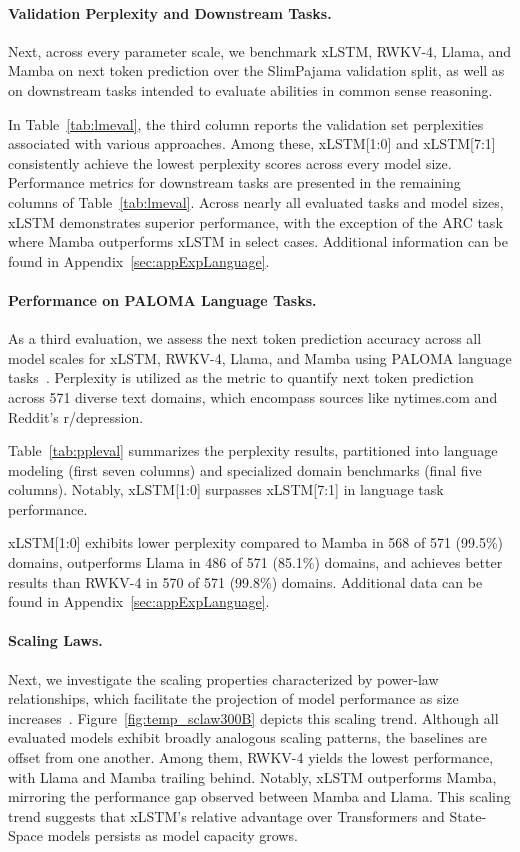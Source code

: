 \paragraph{Validation Perplexity and Downstream Tasks.}
\label{sec:spaj_downstream_eval}
Next, across every parameter scale, we benchmark xLSTM, RWKV-4, Llama, and Mamba on next token prediction over the SlimPajama validation split, as well as on downstream tasks intended to evaluate abilities in common sense reasoning.

In Table~\ref{tab:lmeval}, the third column reports the validation set perplexities associated with various approaches. Among these, xLSTM[1:0] and xLSTM[7:1] consistently achieve the lowest perplexity scores across every model size. Performance metrics for downstream tasks are presented in the remaining columns of Table~\ref{tab:lmeval}. Across nearly all evaluated tasks and model sizes, xLSTM demonstrates superior performance, with the exception of the ARC task where Mamba outperforms xLSTM in select cases. Additional information can be found in Appendix~\ref{sec:appExpLanguage}.

\paragraph{Performance on PALOMA Language Tasks.} As a third evaluation, we assess the next token prediction accuracy across all model scales for xLSTM, RWKV-4, Llama, and Mamba using PALOMA language tasks~\citep{Magnusson:23arxivshort}. Perplexity is utilized as the metric to quantify next token prediction across 571 diverse text domains, which encompass sources like nytimes.com and Reddit's r/depression.

Table~\ref{tab:ppleval} summarizes the perplexity results, partitioned into language modeling (first seven columns) and specialized domain benchmarks (final five columns). Notably, xLSTM[1:0] surpasses xLSTM[7:1] in language task performance.

xLSTM[1:0] exhibits lower perplexity compared to Mamba in 568 of 571 (99.5\%) domains, outperforms Llama in 486 of 571 (85.1\%) domains, and achieves better results than RWKV-4 in 570 of 571 (99.8\%) domains. Additional data can be found in Appendix~\ref{sec:appExpLanguage}.

\paragraph{Scaling Laws.} Next, we investigate the scaling properties characterized by power-law relationships, which facilitate the projection of model performance as size increases~\citep{Kaplan:20,Brown:20short}. Figure~\ref{fig:temp_sclaw300B} depicts this scaling trend. Although all evaluated models exhibit broadly analogous scaling patterns, the baselines are offset from one another. Among them, RWKV-4 yields the lowest performance, with Llama and Mamba trailing behind. Notably, xLSTM outperforms Mamba, mirroring the performance gap observed between Mamba and Llama. This scaling trend suggests that xLSTM's relative advantage over Transformers and State-Space models persists as model capacity grows.

